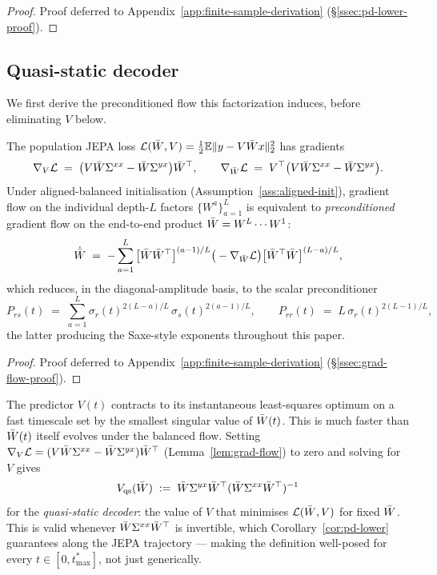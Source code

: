 \begin{proof}
Proof deferred to Appendix~\ref{app:finite-sample-derivation}
(\S\ref{ssec:pd-lower-proof}).
\end{proof}

\subsection{Quasi-static decoder}
\label{sec:quasistatic}

We first derive the preconditioned flow this factorization induces, before eliminating $V$ below.

\begin{lemma}
\label{lem:grad-flow}
The population JEPA loss $\mathcal{L}(\bar{W}, V) = \tfrac12\mathbb{E}\|y - V\bar{W} x\|_2^2$ has
gradients
\begin{equation}
\label{eq:grads}
\nabla_V \mathcal{L} \;=\; \big(V\bar{W}\Sigma^{xx} - \bar{W}\Sigma^{yx}\big)\bar{W}^\top,
\qquad
\nabla_{\bar{W}} \mathcal{L} \;=\; V^\top\big(V\bar{W}\Sigma^{xx} - \bar{W}\Sigma^{yx}\big).
\end{equation}
Under aligned-balanced initialisation (Assumption~\ref{ass:aligned-init}), gradient flow on
the individual depth-$L$ factors $\{W^a\}_{a=1}^L$ is equivalent to \emph{preconditioned}
gradient flow on the end-to-end product $\bar{W} = W^L \cdots W^1$:
\begin{equation}
\label{eq:preconditioned-flow}
\dot{\bar{W}}
\;=\;
-\sum_{a=1}^{L} \big[\bar{W}\bar{W}^\top\big]^{(a-1)/L}
\big(-\nabla_{\bar{W}}\mathcal{L}\big)
\big[\bar{W}^\top\bar{W}\big]^{(L-a)/L},
\end{equation}
which reduces, in the diagonal-amplitude basis, to the scalar preconditioner
\begin{equation}
\label{eq:preconditioner}
P_{rs}(t) \;=\; \sum_{a=1}^L \sigma_r(t)^{2(L-a)/L}\,\sigma_s(t)^{2(a-1)/L},
\qquad
P_{rr}(t) \;=\; L\,\sigma_r(t)^{2(L-1)/L},
\end{equation}
the latter producing the Saxe-style exponents throughout this paper.
\end{lemma}

\begin{proof}
Proof deferred to Appendix~\ref{app:finite-sample-derivation}
(\S\ref{ssec:grad-flow-proof}).
\end{proof}

The predictor $V(t)$ contracts to its instantaneous least-squares
optimum on a fast timescale set by the smallest singular value of
$\bar{W}(t)$. This is much faster than $\bar{W}(t)$ itself evolves under the
balanced flow.
Setting $\nabla_V\mathcal{L} = (V\bar{W}\Sigma^{xx} - \bar{W}\Sigma^{yx})\bar{W}^\top$
(Lemma~\ref{lem:grad-flow}) to zero and solving for $V$ gives
\[
V_{\mathrm{qs}}(\bar{W}) \;:=\; \bar{W} \Sigma^{yx} \bar{W}^\top (\bar{W} \Sigma^{xx} \bar{W}^\top)^{-1}
\]
for the \emph{quasi-static decoder}: the value of $V$ that minimises
$\mathcal{L}(\bar{W}, V)$ for fixed $\bar{W}$. This is valid whenever
$\bar{W}\Sigma^{xx}\bar{W}^\top$ is invertible, which Corollary~\ref{cor:pd-lower} guarantees
along the JEPA trajectory — making the definition well-posed for every
$t \in [0, t_{\max}^*]$, not just generically.

